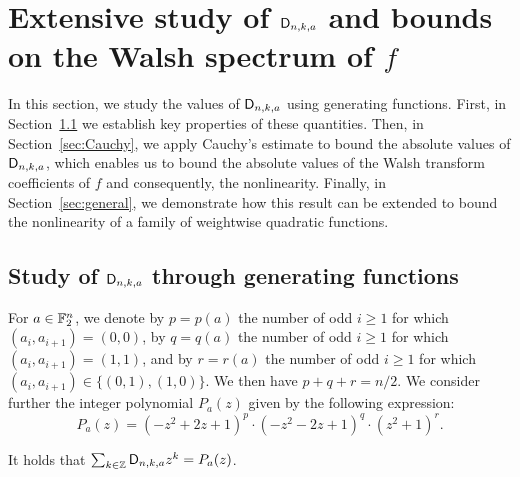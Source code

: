 \documentclass[11pt]{llncs}
\begin{document}









\section{Extensive study of $\mathsf{D}_{n,k,a}$ and bounds on the Walsh spectrum of $f$}

In this section, we study the values of $\mathsf{D}_{n,k,a}$ using generating functions. First, in Section~\ref{sec:genfunc} we establish key properties of these quantities. Then, in Section~\ref{sec:Cauchy}, we apply Cauchy's estimate to bound the absolute values of $\mathsf{D}_{n,k,a}$, which enables us to bound the absolute values of the Walsh transform coefficients of $f$ and consequently, the nonlinearity.
Finally, in Section~\ref{sec:general}, we demonstrate how this result can be extended to bound the nonlinearity of a family of weightwise quadratic functions.










\subsection{Study of $\mathsf{D}_{n,k,a}$ through generating functions}\label{sec:genfunc}
For $a\in\mathbb{F}_2^n$, we denote by $p=p(a)$ the number of odd $i\geq 1$ for which $(a_i,a_{i+1})=(0,0)$, by $q=q(a)$ the number of odd $i\geq 1$ for which $(a_i,a_{i+1})=(1,1)$, and by $r=r(a)$ the number of odd $i\geq 1$ for which $(a_i,a_{i+1})\in\{(0,1),(1,0)\}$. We then have $p+q+r=n/2$. 
We consider further the integer polynomial $P_a(z)$ given by the following expression:
\[
P_a(z)=(-z^2+2z+1)^{p}\cdot(-z^2-2z+1)^{q}\cdot(z^2+1)^{r}.
\]

\begin{proposition}\label{proposition:generating_fct}
	It holds that $\sum_{k\in\mathbb{Z}}\mathsf{D}_{n,k,a} z^k= P_a(z)$.
\end{proposition}
\end{document}
